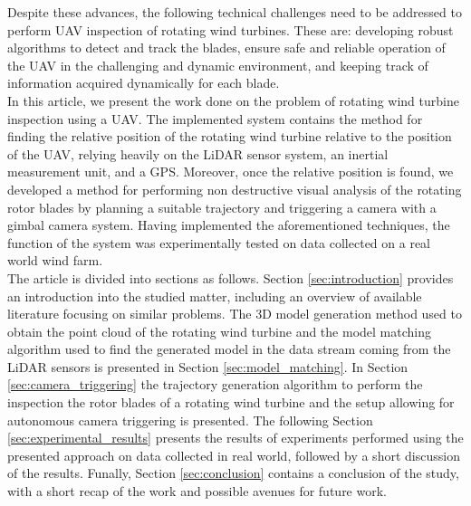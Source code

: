 Despite these advances, the following technical challenges need to be addressed to perform UAV inspection of rotating wind turbines. These are: developing robust algorithms to detect and track the blades, ensure safe and reliable operation of the UAV in the challenging and dynamic environment, and keeping track of information acquired dynamically for each blade.\\

In this article, we present the work done on the problem of rotating wind turbine inspection using a UAV. The implemented system contains the method for finding the relative position of the rotating wind turbine relative to the position of the UAV, relying heavily on the LiDAR sensor system, an inertial measurement unit, and a GPS. Moreover, once the relative position is found, we developed a method for performing non destructive visual analysis of the rotating rotor blades by planning a suitable trajectory and triggering a camera with a gimbal camera system. Having implemented the aforementioned techniques, the function of the system was experimentally tested on data collected on a real world wind farm.\\

The article is divided into sections as follows. Section \ref{sec:introduction} provides an introduction into the studied matter, including an overview of available literature focusing on similar problems. The 3D model generation method used to obtain the point cloud of the rotating wind turbine and the model matching algorithm used to find the generated model in the data stream coming from the LiDAR sensors is presented in Section \ref{sec:model_matching}. In Section \ref{sec:camera_triggering} the trajectory generation algorithm to perform the inspection the rotor blades of a rotating wind turbine and the setup allowing for autonomous camera triggering is presented. The following Section \ref{sec:experimental_results} presents the results of experiments performed using the presented approach on data collected in real world, followed by a short discussion of the results. Funally, Section \ref{sec:conclusion} contains a conclusion of the study, with a short recap of the work and possible avenues for future work.

